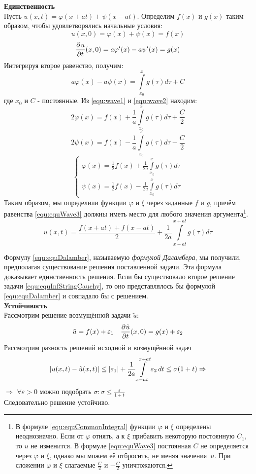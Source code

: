 \textbf{Единственность}\\
	Пусть $u(x, t) = \varphi (x + at) + \psi (x - at)$. Определим $f(x)$ и $g(x)$ таким образом, чтобы удовлетворялись начальные условия:
\begin{equation}
	u(x, 0) = \varphi (x) + \psi(x) = f(x)
	\label{equ:wave1}
\end{equation}
\[
	\frac{\partial^{}u}{\partial t^{}} (x, 0) = a \varphi'(x) - a \psi' (x) = g(x)
\]
Интегрируя второе равенство, получим:
\begin{equation}
	a \varphi(x) - a \psi(x) = \int\limits_{x_0}^{x} g(\tau) d \tau  + C
	\label{equ:wave2}
\end{equation}
где $x_0$ и $C$ - постоянные. Из \eqref{equ:wave1} и \eqref{equ:wave2} находим:
\[
	2 \varphi(x) = f(x) + \frac{1}{a} \int\limits_{x_0}^x g(\tau) d \tau + \frac{C}{2}
\]
\[
	2 \psi(x) = f(x) - \frac{1}{a} \int\limits_{x_0}^x g(\tau) d \tau - \frac{C}{2} 
\]
\begin{equation}
\begin{cases}
	 \varphi(x)  = \frac{1}{2} f(x) + \frac{1}{2a} \int\limits_{x_0}^x g(\tau) d \tau\\
	\psi(x) = \frac{1}{2} f(x) - \frac{1}{2a} \int\limits_{x_0}^x g(\tau) d \tau
\end{cases}
\label{equ:equWave3}
\end{equation}
Таким образом, мы определили функции $\varphi$ и $\xi$ через заданные $f$ и $g$, причём равенства \eqref{equ:equWave3} должны иметь место для любого значения аргумента\footnote{В формуле \eqref{equ:equCommonIntegral} функции $\varphi$ и $\xi$ определены неоднозначно. Если от $\varphi$ отнять, а к $\xi$ прибавить некоторую постоянную $C_1$, то $u$ не изменится. В формуле \eqref{equ:equWave3} постоянная $C$ не определяется через $\varphi$ и $\xi$, однако мы можем её отбросить, не меняя значения~$u$. При сложении $\varphi$ и $\xi$ слагаемые $\frac{C}{2}$ и $-\frac{C}{2}$  уничтожаются.}.
\begin{equation}
	u(x, t) = \frac{f(x + at) + f(x - at)}{2} + \frac{1}{2a} \int\limits_{x - at}^{x + at} g (\tau) d \tau
	\label{equ:equDalamber}
\end{equation}

Формулу \eqref{equ:equDalamber}, называемую \textit{формулой Даламбера}, мы получили, предполагая существование решения поставленной задачи. Эта формула доказывает единственность решения. Если бы существовало второе решение задачи \eqref{equ:equInfStringCauchy}, то оно представлялось бы формулой \eqref{equ:equDalamber} и совпадало бы с решением.\\

\textbf{Устойчивость}\\
Рассмотрим решение возмущённой задачи $\tilde u$:
\[
	\tilde u = f(x) + \varepsilon_1 \quad \frac{\partial^{}\tilde u}{\partial t^{}} (x, 0) = g(x) + \varepsilon_2
\]
Рассмотрим разность решений исходной и возмущённой задач
\[
	\left | u(x, t) - \tilde u (x, t) \right | \leq \left | \varepsilon_1 \right | + \frac{1}{2a} \int\limits_{x - at}^{x + at} \varepsilon_2\, dt \leq \sigma(1 + t) \Rightarrow
\]
$\Rightarrow$ $\forall \varepsilon >0$ можно подобрать $\sigma: \sigma \leq \frac{\varepsilon}{1 + t}$\\
Следовательно решение устойчиво.
		


